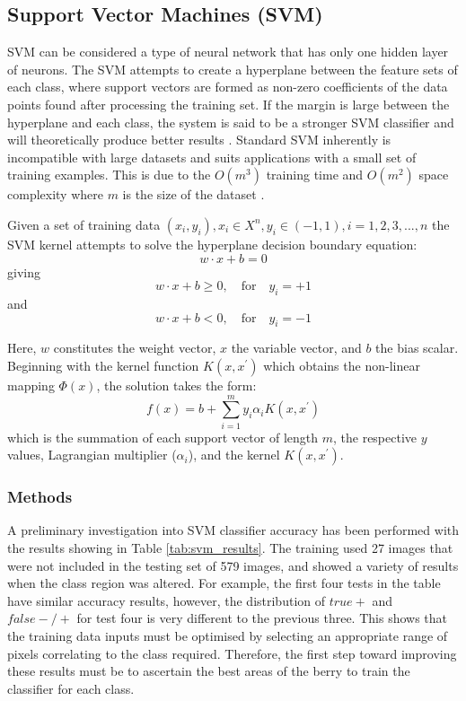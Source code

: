 \documentclass[fleqn,twoside,12pt]{report}
\begin{document}
\subsection{Support Vector Machines (SVM)}

SVM can be considered a type of neural network that has only one hidden layer of neurons. The SVM attempts to create a hyperplane between the feature sets of each class, where support vectors are formed as non-zero coefficients of the data points found after processing the training set. If the margin is large between the hyperplane and each class, the system is said to be a stronger SVM classifier and will theoretically produce better results \cite{osuna}. Standard SVM inherently is incompatible with large datasets and suits applications with a small set of training examples. This is due to the $O(m^3)$ training time and $O(m^2)$ space complexity where $m$ is the size of the dataset \cite{tsang}.

Given a set of training data {$(x_i, y_i), x_i \in X^n, y_i \in (-1,1), i = 1,2,3,...,n$} the SVM kernel attempts to solve the hyperplane decision boundary equation:
\begin{equation}
w \cdot x + b = 0
\end{equation} 
giving
\begin{equation}
w \cdot x + b \geq 0, \quad \textrm{for} \quad y_i = +1
\end{equation}
and
\begin{equation}
w \cdot x + b < 0, \quad \textrm{for} \quad y_i = -1
\end{equation}

Here, $w$ constitutes the weight vector, $x$ the variable vector, and $b$ the bias scalar. Beginning with the kernel function $K(x, x^\prime)$ which obtains the non-linear mapping $\Phi(x)$, the solution takes the form:
\begin{equation}
f(x) = b + \sum_{i=1}^{m} y_i \alpha_i K(x, x^\prime)
\end{equation}
which is the summation of each support vector of length $m$, the respective $y$ values, Lagrangian multiplier ($\alpha_i$), and the kernel $K(x, x^\prime)$.

\subsubsection{Methods}

A preliminary investigation into SVM classifier accuracy has been performed with the results showing in Table \ref{tab:svm_results}. The training used 27 images that were not included in the testing set of 579 images, and showed a variety of results when the class region was altered. For example, the first four tests in the table have similar accuracy results, however, the distribution of $true +$ and $false -/+$ for test four is very different to the previous three. This shows that the training data inputs must be optimised by selecting an appropriate range of pixels correlating to the class required. Therefore, the first step toward improving these results must be to ascertain the best areas of the berry to train the classifier for each class. 
\end{document}
